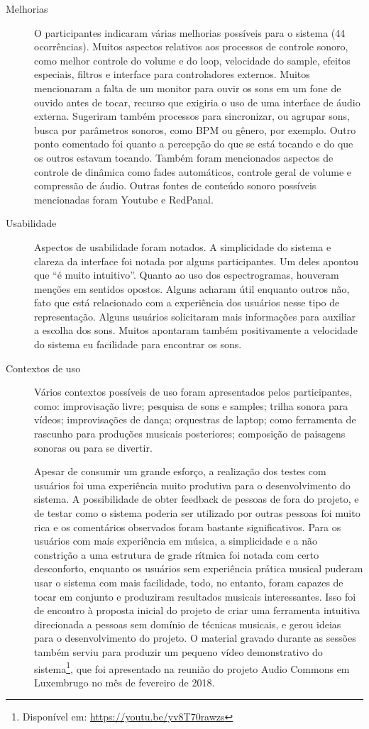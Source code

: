 \begin{description}
\item[Melhorias] O participantes indicaram várias melhorias possíveis para o sistema (44 ocorrências). Muitos aspectos relativos aos processos de controle sonoro, como melhor controle do volume e do loop, velocidade do sample, efeitos especiais, filtros e interface para controladores externos. Muitos mencionaram a falta de um monitor para ouvir os sons em um fone de ouvido antes de tocar, recurso que exigiria o uso de uma interface de áudio externa. Sugeriram também processos para sincronizar, ou agrupar sons, busca por parâmetros sonoros, como BPM ou gênero, por exemplo. Outro ponto comentado foi quanto a percepção do que se está tocando e do que os outros estavam tocando. Também foram mencionados aspectos de controle de dinâmica como fades automáticos, controle geral de volume e compressão de áudio. Outras fontes de conteúdo sonoro possíveis mencionadas foram Youtube e RedPanal.

\item[Usabilidade] Aspectos de usabilidade foram notados. A simplicidade do sistema e clareza da interface foi notada por alguns participantes. Um deles apontou que ``é muito intuitivo''. Quanto ao uso dos espectrogramas, houveram menções em sentidos opostos. Alguns acharam útil enquanto outros não, fato que está relacionado com a experiência dos usuários nesse tipo de representação. Alguns usuários solicitaram mais informações para auxiliar a escolha dos sons. Muitos apontaram também positivamente a velocidade do sistema eu facilidade para encontrar os sons.

\item[Contextos de uso] Vários contextos possíveis de uso foram apresentados pelos participantes, como: improvisação livre; pesquisa de sons e samples; trilha sonora para vídeos; improvisações de dança; orquestras de laptop; como ferramenta de rascunho para produções musicais posteriores; composição de paisagens sonoras ou para se divertir.

Apesar de consumir um grande esforço, a realização dos testes com usuários foi uma experiência muito produtiva para o desenvolvimento do sistema. A possibilidade de obter feedback de pessoas de fora do projeto, e de testar como o sistema poderia ser utilizado por outras pessoas foi muito rica e os comentários observados foram bastante significativos. Para os usuários com mais experiência em música, a simplicidade e a não constrição a uma estrutura de grade rítmica foi notada com certo desconforto, enquanto os usuários sem experiência prática musical puderam usar o sistema com mais facilidade, todo, no entanto, foram capazes de tocar em conjunto e produziram resultados musicais interessantes. Isso foi de encontro à proposta inicial do projeto de criar uma ferramenta intuitiva direcionada a pessoas sem domínio de técnicas musicais, e gerou ideias para o desenvolvimento do projeto. O material gravado durante as sessões também serviu para produzir um pequeno vídeo demonstrativo do sistema\footnote{Disponível em: \url{https://youtu.be/yv8T70rawzs}}, que foi apresentado na reunião do projeto Audio Commons em Luxembrugo no mês de fevereiro de 2018. 




\end{description}
